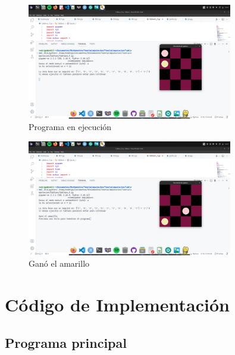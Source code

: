 \documentclass[11pt]{article} %
\begin{document}
	\begin{figure}[h]
		\centering
		\includegraphics[width=0.8\textwidth]{imagen5.png}
		\caption{Programa en ejecución}
	\end{figure}
	
	\begin{figure}[h]
		\centering
		\includegraphics[width=0.8\textwidth]{imagen6.png}
		\caption{Ganó el amarillo}
	\end{figure}
	
	
	\section{Código de Implementación}
	
	\subsection{Programa principal}
	
\end{document}
